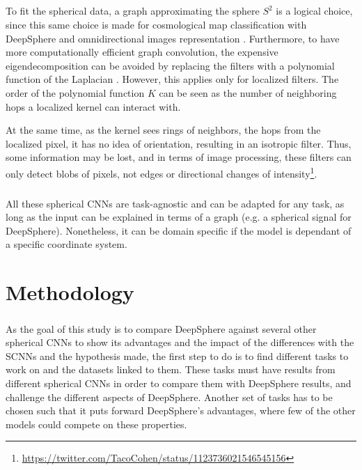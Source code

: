 \documentclass[11pt]{report}
\begin{document}
\paragraph*{}
To fit the spherical data, a graph approximating the sphere $S^2$ is a logical choice, since this same choice is made for cosmological map classification with DeepSphere \cite{perraudin_deepsphere:_2018} and omnidirectional images representation \cite{khasanova_geometry_nodate, frossard_graph-based_2017}.
Furthermore, to have more computationally efficient graph convolution, the expensive eigendecomposition can be avoided by replacing the filters with a polynomial function of the Laplacian \cite{defferrard_convolutional_2016, frossard_graph-based_2017}. However, this applies only for localized filters. The order of the polynomial function $K$ can be seen as the number of neighboring hops a localized kernel can interact with.

At the same time, as the kernel sees rings of neighbors, the hops from the localized pixel, it has no idea of orientation, resulting in an isotropic filter. Thus, some information may be lost, and in terms of image processing, these filters can only detect blobs of pixels, not edges or directional changes of intensity\footnote{\url{https://twitter.com/TacoCohen/status/1123736021546545156}}.
    
\paragraph*{}
All these spherical CNNs are task-agnostic and can be adapted for any task, as long as the input can be explained in terms of a graph (e.g. a spherical signal for DeepSphere). 
Nonetheless, it can be domain specific if the model is dependant of a specific coordinate system.


\chapter{Methodology}\label{chap:Datasets}
\paragraph*{}
As the goal of this study is to compare DeepSphere \cite{perraudin_deepsphere:_2018} against several other spherical CNNs to show its advantages and the impact of the differences with the SCNNs and the hypothesis made, the first step to do is to find different tasks to work on and the datasets linked to them. 
These tasks must have results from different spherical CNNs in order to compare them with DeepSphere results, and challenge the different aspects of DeepSphere. Another set of tasks has to be chosen such that it puts forward DeepSphere's advantages, where few of the other models could compete on these properties.
\end{document}
